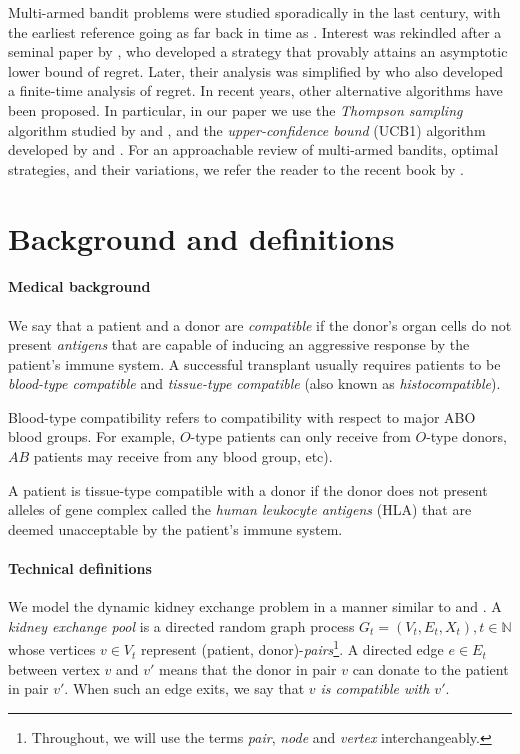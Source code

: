 Multi-armed bandit problems were studied sporadically in the last century, with the earliest reference going as far back in time as \cite{thompson1933likelihood}. Interest was rekindled after a seminal paper by \cite{lai1985asymptotically}, who developed a strategy that provably attains an asymptotic lower bound of regret. Later, their analysis was simplified by \cite{agrawal1995sample} who also developed a finite-time analysis of regret. In recent years, other alternative algorithms have been proposed. In particular, in our paper we use the \emph{Thompson sampling} algorithm studied by \cite{agrawal2012analysis} and \cite{kaufmann2012thompson}, and the \emph{upper-confidence bound} (UCB1) algorithm developed by \cite{agrawal1995sample} and \cite{auer2002finite}. For an approachable review of multi-armed bandits, optimal strategies, and their variations, we refer the reader to the recent book by \cite{lattimore2018bandits}.


\section{Background and definitions}

\paragraph{Medical background} We say that a patient and a donor are \emph{compatible} if the donor's organ cells do not present \emph{antigens} that are capable of inducing an aggressive response by the patient's immune system. A successful transplant usually requires patients to be \emph{blood-type compatible} and \emph{tissue-type compatible} (also known as \emph{histocompatible}). 

Blood-type compatibility refers to compatibility with respect to major ABO blood groups. For example, $O$-type patients can only receive from $O$-type donors, $AB$ patients may receive from any blood group, etc). 

A patient is tissue-type compatible with a donor if the donor does not present alleles of gene complex called the \emph{human leukocyte antigens} (HLA) that are deemed unacceptable by the patient's immune system.  


\paragraph{Technical definitions} We model the dynamic kidney exchange problem in a manner similar to \cite{unver2010dynamic} and \cite{akbarpour2017thickness}. A \emph{kidney exchange pool} is a directed random graph process $G_t = (V_t, E_t, X_t), t \in \mathbb{N}$ whose vertices $v \in V_t$ represent (patient, donor)-\emph{pairs}\footnote{Throughout, we will use the terms \emph{pair}, \emph{node} and \emph{vertex} interchangeably.}. A directed edge $e \in E_t$ between vertex $v$ and $v'$ means that the donor in pair $v$ can donate to the patient in pair $v'$. When such an edge exits, we say that \emph{$v$ is compatible with $v'$}.

